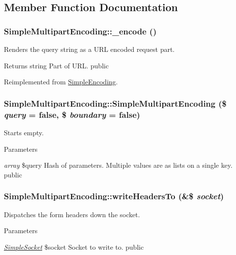\subsection{Member Function Documentation}
\hypertarget{class_simple_multipart_encoding_abaf98447496b4c38e470684da14e9ef5}{
\subsubsection[{\_\-encode}]{\setlength{\rightskip}{0pt plus 5cm}SimpleMultipartEncoding::\_\-encode ()}}
\label{class_simple_multipart_encoding_abaf98447496b4c38e470684da14e9ef5}
Renders the query string as a URL encoded request part. \begin{DoxyReturn}{Returns}
string Part of URL.  public 
\end{DoxyReturn}


Reimplemented from \hyperlink{class_simple_encoding_a934397a98be4dab7d58382d83222765b}{SimpleEncoding}.\hypertarget{class_simple_multipart_encoding_ad7311975ea717cd2ce3eb44db7a2ec90}{
\subsubsection[{SimpleMultipartEncoding}]{\setlength{\rightskip}{0pt plus 5cm}SimpleMultipartEncoding::SimpleMultipartEncoding (\$ {\em query} = {\ttfamily false}, \/  \$ {\em boundary} = {\ttfamily false})}}
\label{class_simple_multipart_encoding_ad7311975ea717cd2ce3eb44db7a2ec90}
Starts empty. 
\begin{DoxyParams}{Parameters}
\item[{\em array}]\$query Hash of parameters. Multiple values are as lists on a single key.  public \end{DoxyParams}
\hypertarget{class_simple_multipart_encoding_a6b5cef09d6de499b8eec15bf81ac70fc}{
\subsubsection[{writeHeadersTo}]{\setlength{\rightskip}{0pt plus 5cm}SimpleMultipartEncoding::writeHeadersTo (\&\$ {\em socket})}}
\label{class_simple_multipart_encoding_a6b5cef09d6de499b8eec15bf81ac70fc}
Dispatches the form headers down the socket. 
\begin{DoxyParams}{Parameters}
\item[{\em \hyperlink{class_simple_socket}{SimpleSocket}}]\$socket Socket to write to.  public \end{DoxyParams}


